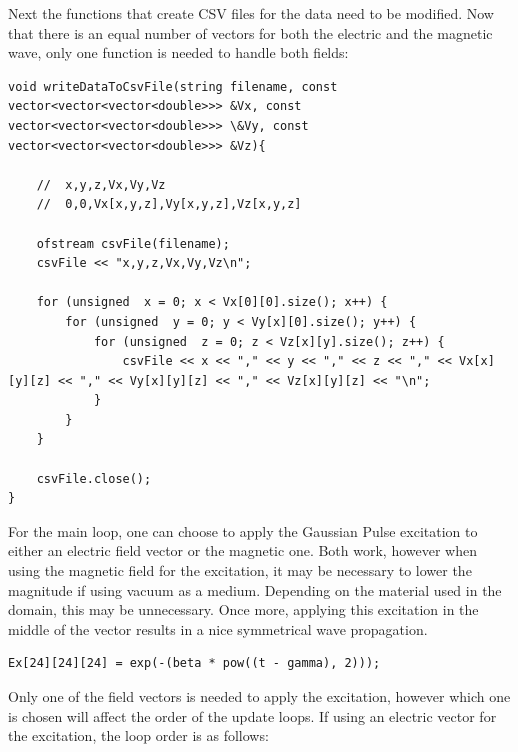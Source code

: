 Next the functions that create CSV files for the data need to be modified. Now that there is an equal number of vectors for both the electric and the magnetic wave, only one function is needed to handle both fields:

\begin{verbatim}
void writeDataToCsvFile(string filename, const vector<vector<vector<double>>> &Vx, const vector<vector<vector<double>>> \&Vy, const vector<vector<vector<double>>> &Vz){
	
	//	x,y,z,Vx,Vy,Vz
	//	0,0,Vx[x,y,z],Vy[x,y,z],Vz[x,y,z]
	
	ofstream csvFile(filename);
	csvFile << "x,y,z,Vx,Vy,Vz\n";
	
	for (unsigned  x = 0; x < Vx[0][0].size(); x++) {
		for (unsigned  y = 0; y < Vy[x][0].size(); y++) {
			for (unsigned  z = 0; z < Vz[x][y].size(); z++) {
				csvFile << x << "," << y << "," << z << "," << Vx[x][y][z] << "," << Vy[x][y][z] << "," << Vz[x][y][z] << "\n";
			}
		}
	}
	
	csvFile.close();
}
\end{verbatim}

For the main loop, one can choose to apply the Gaussian Pulse excitation to either an electric field vector or the magnetic one. Both work, however when using the magnetic field for the excitation, it may be necessary to lower the magnitude if using vacuum as a medium. Depending on the material used in the domain, this may be unnecessary. Once more, applying this excitation in the middle of the vector results in a nice symmetrical wave propagation.

\begin{verbatim}
Ex[24][24][24] = exp(-(beta * pow((t - gamma), 2)));
\end{verbatim}

Only one of the field vectors is needed to apply the excitation, however which one is chosen will affect the order of the update loops. If using an electric vector for the excitation, the loop order is as follows:

